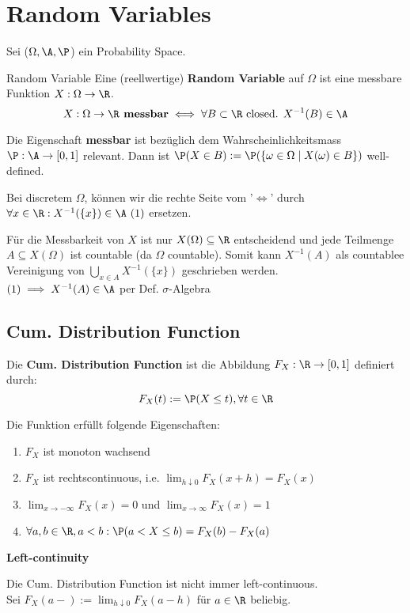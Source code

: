 \section{Random Variables}
Sei ($\Omega, \A, \P$) ein Probability Space.
\begin{mainbox}{Random Variable}
    Eine (reellwertige) \textbf{Random Variable} auf $\Omega$ ist eine messbare Funktion $X: \Omega \to \R$.
    $$X: \Omega \to \R \textbf{ messbar} \iff \forall B \subset \R \text { closed. } X^{-1}(B) \in \A$$
 
    Die Eigenschaft \textbf{messbar} ist bezüglich dem Wahrscheinlichkeitsmass $\P: \A \to [0,1]$ relevant. Dann ist $\P(X \in B) := \P(\{\omega \in \Omega \mid X(\omega) \in B\})$ well-defined.
\end{mainbox}
Bei discretem $\Omega$, können wir die rechte Seite vom '$\iff$' durch $\forall x \in \R: X^{-1}(\{x\})\in \A \ (1)$ ersetzen. 

Für die Messbarkeit von $X$ ist nur $X(\Omega) \subseteq \R$ entscheidend und jede Teilmenge $A \subseteq X(\Omega)$ ist countable (da $\Omega$ countable). Somit kann $X^{-1}(A)$ als countablee Vereinigung von $\bigcup_{x \in A} X^{-1}(\{x\})$ geschrieben werden. 
\\$(1) \implies X^{-1}(A) \in \A$ per Def. $\sigma$-Algebra
\subsection{Cum. Distribution Function}
Die \textbf{Cum. Distribution Function} ist die Abbildung $F_X : \R \to [0,1]$ definiert durch:
$$F_X(t) := \P(X \leq t), \forall t \in \R$$

Die Funktion erfüllt folgende Eigenschaften:
\begin{enumerate}
    \item $F_X$ ist monoton wachsend 
    \item $F_X$ ist rechtscontinuous, i.e. $\lim_{h \downarrow 0}F_X(x+h) = F_X(x)$
    \item $\lim_{x \to -\infty}F_X(x) = 0$ und $\lim_{x \to \infty}F_X(x) = 1$
    \item $\forall a,b \in \R, a < b: \P(a < X \leq b) = F_X(b) -F_X(a)$ 
\end{enumerate}

\textbf{Left-continuity}

Die Cum. Distribution Function ist nicht immer left-continuous.
\\Sei $F_X(a-) := \lim_{h \downarrow 0}F_X(a-h)$ für $a \in \R$ beliebig.

